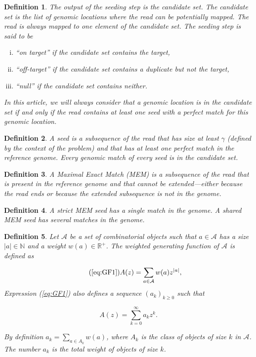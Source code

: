\documentclass{article}
\newtheorem{definition}{Definition}
\begin{document}
\begin{definition}
The output of the seeding step is the candidate set. The candidate set is
the list of genomic locations where the read can be potentially mapped.
The read is always mapped to one element of the candidate set. The seeding
step is said to be
\begin{enumerate}[i)]
\item ``on target'' if the candidate set contains the target,
\item ``off-target'' if the candidate set contains a duplicate but not the target, 
\item ``null'' if the candidate set contains neither.
\end{enumerate}
In this article, we will always consider that a genomic location is in the
candidate set if and only if the read contains at least one seed with a
perfect match for this genomic location.
\end{definition}

\begin{definition}
A seed is a subsequence of the read that has size at least $\gamma$
(defined by the context of the problem) and that has at least one perfect
match in the reference genome. Every genomic match of every seed is in the
candidate set. 
\end{definition}

\begin{definition}
A Maximal Exact Match (MEM) is a subsequence of the read that is present
in the reference genome and that cannot be extended---either because the
read ends or because the extended subsequence is not in the genome.
\end{definition}

\begin{definition}
A \emph{strict} MEM seed has a single match in the genome.
A \emph{shared} MEM seed has several matches in the genome.
\end{definition}

\begin{definition}
Let $\mathcal{A}$ be a set of combinatorial objects such that $a \in
\mathcal{A}$ has a size $|a| \in \mathbb{N}$ and a weight $w(a) \in
\mathbb{R}^+$. The weighted generating function of $\mathcal{A}$ is
defined as

\begin{equation}
\tag{\ref{eq:GF1}}
A(z) = \sum_{a \in \mathcal{A}} w(a) z^{|a|},
\end{equation}
Expression (\ref{eq:GF1}) also defines a sequence $(a_k)_{k \geq 0}$ such
that 

\begin{equation*}
A(z) = \sum_{k=0}^\infty a_k z^k.
\end{equation*}

By definition $a_k = \sum_{a \in A_k}w(a)$, where $A_k$ is the class of
objects of size $k$ in $\mathcal{A}$. The number $a_k$ is the
total weight of objects of size $k$.
\end{definition}
\end{document}
